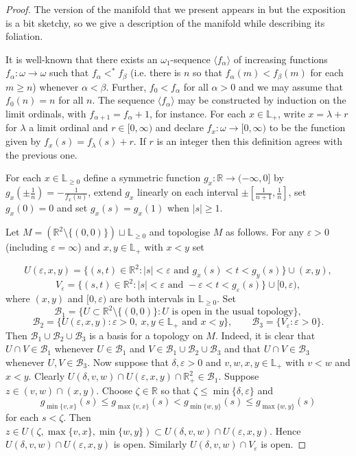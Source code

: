 \documentclass{amsart}
\begin{document}
\begin{proof}
The version of the manifold that we present appears in \cite{Nyikos90} but the exposition is a bit sketchy, so we give a description of the manifold while describing its foliation.

It is well-known that there exists an $\omega_1$-sequence $\langle f_\alpha\rangle$ of increasing functions 
$f_\alpha:\omega\to\omega$ such that $f_\alpha<^*f_\beta$ (i.e. there is $n$ so that $f_\alpha(m)<f_\beta(m)$ for each $m\ge n$) whenever $\alpha<\beta$. 
Further, $f_0<f_\alpha$ for all $\alpha>0$ and we may assume that $f_0(n)=n$ for all $n$. 
The sequence $\langle f_\alpha\rangle$ may be constructed by induction on the limit ordinals, with $f_{\alpha+1}=f_\alpha+1$, for instance.
For each $x\in{\mathbb{L}}_+$, write $x=\lambda+r$ for $\lambda$ a limit ordinal and $r\in[0,\infty)$ and declare 
$f_x:\omega\to[0,\infty)$ to be the function given by $f_x(s)=f_\lambda(s)+r$. If $r$ is an integer then this definition agrees with the previous one.

For each $x\in\mathbb L_{\ge0}$ define a symmetric function $g_x:\mathbb R\to(-\infty,0]$ by 
$g_x\left(\pm\frac{1}{n}\right)=-\frac{1}{f_x(n)}$, extend $g_x$ linearly on each interval 
$\pm\left[\frac{1}{n+1},\frac{1}{n}\right]$, set $g_x(0)=0$ and set $g_x(s)=g_x(1)$ when $|s|\ge 1$. 

Let $M=(\mathbb R^2\setminus\{(0,0)\})\sqcup{\mathbb{L}}_{\ge0}$ and topologise $M$ as follows. 
For any $\varepsilon>0$ (including $\varepsilon=\infty$) and $x,y\in{\mathbb{L}}_+$ with $x<y$ set

$$
  U(\varepsilon,x,y)=\{(s,t)\in\mathbb R^2: |s|<\varepsilon \mbox{ and }g_x(s)<t<g_y(s)\}\cup(x,y),
$$
$$
  V_\varepsilon=\{(s,t)\in\mathbb R^2 : |s|<\varepsilon \mbox{ and }-\varepsilon<t<g_\varepsilon(s)\}\cup[0,\varepsilon),
$$
where $(x,y)$ and $[0,\varepsilon)$ are both intervals in $\mathbb L_{\ge0}$.
Set
$$
  \mathcal B_1=\{ U\subset\mathbb R^2\setminus\{(0,0)\}: U \mbox{ is open in the usual topology}\},
$$
$$
  \mathcal B_2=\{U(\varepsilon,x,y) : \varepsilon>0,\ x,y\in{\mathbb{L}}_+\mbox{ and } x<y\},
\qquad  \mathcal B_3=\{V_\varepsilon : \varepsilon>0\}.
$$
Then $\mathcal B_1\cup\mathcal B_2\cup\mathcal B_3$ is a basis for a topology on $M$. Indeed, it is clear that $U\cap V\in\mathcal B_1$ whenever $U\in\mathcal B_1$ and $V\in\mathcal B_1\cup\mathcal B_2\cup\mathcal B_3$ and that 
  $U\cap V\in\mathcal B_3$ whenever $U,V\in\mathcal B_3$. Now suppose that $\delta,\varepsilon>0$ and $v,w,x,y\in\mathbb L_+$ with $v<w$ and $x<y$. 
  Clearly $U(\delta,v,w)\cap U(\varepsilon,x,y)\cap\mathbb R_+^2\in\mathcal B_1$. Suppose $z\in(v,w)\cap(x,y)$. 
  Choose $\zeta\in\mathbb R$ so that $\zeta\le\min\{\delta,\varepsilon\}$ and
  $$
    g_{\min\{v,x\}}(s)\le g_{\max\{v,x\}}(s)<g_{\min\{w,y\}}(s)\le g_{\max\{w,y\}}(s)
  $$
  for each $s<\zeta$. Then $z\in U(\zeta,\max\{v,x\},\min\{w,y\})\subset U(\delta,v,w)\cap U(\varepsilon,x,y)$. 
  Hence $U(\delta,v,w)\cap U(\varepsilon,x,y)$ is open. Similarly $U(\delta,v,w)\cap V_\varepsilon$ is open.


\end{proof}
\end{document}
